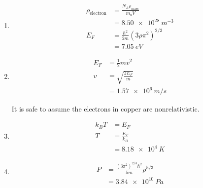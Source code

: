 \documentclass{article}
\begin{document}
\subsection{}

\begin{enumerate}
  \item

        \begin{align*}
          \rho_\text{electron} & = \frac{N_A \rho_\text{mass}}{m_a V}         \\
                               & = \qty{8.50e28}{m^{-3}}                      \\
          E_F                  & = \frac{\hbar^2}{2 m} (3 \rho \pi^2)^{2 / 3} \\
                               & = \qty{7.05}{eV}
        \end{align*}

  \item

        \begin{align*}
          E_F & = \frac{1}{2} m v^2      \\
          v   & = \sqrt{\frac{2 E_F}{m}} \\
              & = \qty{1.57e6}{m/s}
        \end{align*}

        It is safe to assume the electrons in copper are nonrelativistic.

  \item

        \begin{align*}
          k_B T & = E_F             \\
          T     & = \frac{E_F}{k_B} \\
                & = \qty{8.18e4}{K}
        \end{align*}

  \item

        \begin{align*}
          P & = \frac{(3 \pi^2)^{2 / 3} \hbar^2}{5 m} \rho^{5 / 3} \\
            & = \qty{3.84e10}{Pa}
        \end{align*}
\end{enumerate}

\subsection{}
\end{document}
